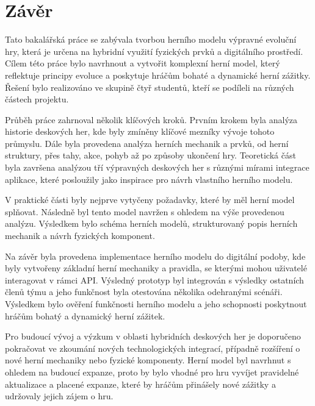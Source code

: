 \chapter{Závěr}

Tato bakalářská práce se zabývala tvorbou herního modelu výpravné evoluční hry, která je určena na hybridní využití fyzických prvků a digitálního prostředí. Cílem této práce bylo navrhnout a vytvořit komplexní herní model, který reflektuje principy evoluce a poskytuje hráčům bohaté a dynamické herní zážitky. Řešení bylo realizováno ve skupině čtyř studentů, kteří se podíleli na různých částech projektu.

Průběh práce zahrnoval několik klíčových kroků. Prvním krokem byla analýza historie deskových her, kde byly zmíněny klíčové mezníky vývoje tohoto průmyslu. Dále byla provedena analýza herních mechanik a prvků, od herní struktury, přes tahy, akce, pohyb až po způsoby ukončení hry. Teoretická část byla završena analýzou tří výpravných deskových her s různými mírami integrace aplikace, které posloužily jako inspirace pro návrh vlastního herního modelu.

V praktické části byly nejprve vytyčeny požadavky, které by měl herní model splňovat. Následně byl tento model navržen s ohledem na výše provedenou analýzu. Výsledkem bylo schéma herních modelů, strukturovaný popis herních mechanik a návrh fyzických komponent.

Na závěr byla provedena implementace herního modelu do digitální podoby, kde byly vytvořeny základní herní mechaniky a pravidla, se kterými mohou uživatelé interagovat v rámci API. Výsledný prototyp byl integrován s výsledky ostatních členů týmu a jeho funkčnost byla otestována několika odehranými scénáři. Výsledkem bylo ověření funkčnosti herního modelu a jeho schopnosti poskytnout hráčům bohatý a dynamický herní zážitek.

Pro budoucí vývoj a výzkum v oblasti hybridních deskových her je doporučeno pokračovat ve zkoumání nových technologických integrací, případně rozšíření o nové herní mechaniky nebo fyzické komponenty. Herní model byl navrhnut s ohledem na budoucí expanze, proto by bylo vhodné pro hru vyvíjet pravidelné aktualizace a placené expanze, které by hráčům přinášely nové zážitky a udržovaly jejich zájem o hru.

